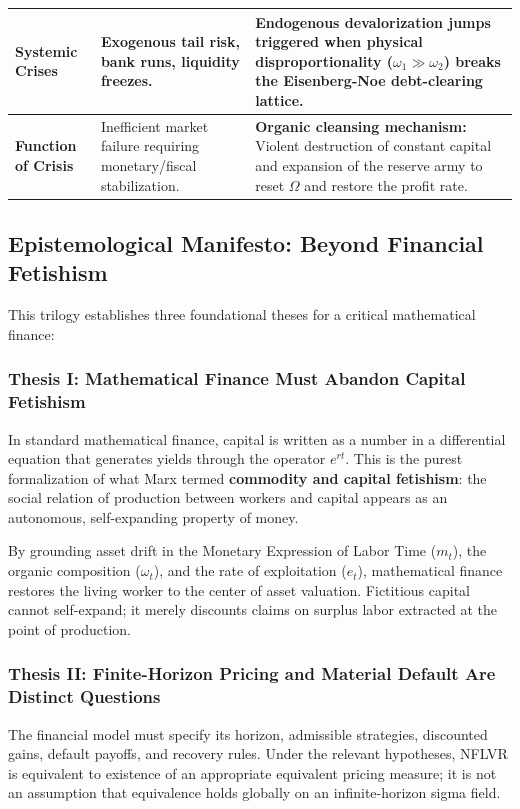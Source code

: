 \documentclass[11pt,letterpaper]{report}
\begin{document}
\begin{longtable}{|>{\raggedright\arraybackslash}p{}|>{\raggedright\arraybackslash}p{}|>{\raggedright\arraybackslash}p{}|}
\textbf{Systemic Crises} & Exogenous tail risk, bank runs, liquidity freezes. & \textbf{Endogenous devalorization jumps} triggered when physical disproportionality (${\omega }_{1}\gg {\omega }_{2}$) breaks the Eisenberg-Noe debt-clearing lattice. \\ \hline
\textbf{Function of Crisis} & Inefficient market failure requiring monetary/fiscal stabilization. & \textbf{Organic cleansing mechanism:} Violent destruction of constant capital and expansion of the reserve army to reset $\Omega$ and restore the profit rate. \\ \hline
\end{longtable}\endgroup
\subsection{Epistemological Manifesto: Beyond Financial Fetishism}
This trilogy establishes three foundational theses for a critical mathematical finance:

\subsubsection{Thesis I: Mathematical Finance Must Abandon Capital Fetishism}
In standard mathematical finance, capital is written as a number in a differential equation that generates yields through the operator ${e}^{rt}$. This is the purest formalization of what Marx termed \textbf{commodity and capital fetishism}: the social relation of production between workers and capital appears as an autonomous, self-expanding property of money.

By grounding asset drift in the Monetary Expression of Labor Time (${m}_{t}$), the organic composition (${\omega }_{t}$), and the rate of exploitation (${e}_{t}$), mathematical finance restores the living worker to the center of asset valuation. Fictitious capital cannot self-expand; it merely discounts claims on surplus labor extracted at the point of production.

\subsubsection{Thesis II: Finite-Horizon Pricing and Material Default Are Distinct Questions}
The financial model must specify its horizon, admissible strategies,
discounted gains, default payoffs, and recovery rules. Under the relevant
hypotheses, NFLVR is equivalent to existence of an appropriate equivalent
pricing measure; it is not an assumption that equivalence holds globally
on an infinite-horizon sigma field.
\end{document}
